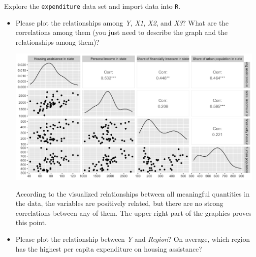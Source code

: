 \documentclass[12pt,letterpaper]{article}
\begin{document}
\vspace{.5cm}
\noindent Explore the \texttt{expenditure} data set and import data into \texttt{R}.
\vspace{.2cm}
  
\vspace{.2cm}
\begin{itemize}

\item
Please plot the relationships among \emph{Y}, \emph{X1}, \emph{X2}, and \emph{X3}? What are the correlations among them (you just need to describe the graph and the relationships among them)?
\vspace{.2cm}
  
\vspace{.2cm} 

\vspace{.2cm}
\includegraphics[width=\textwidth]{Babaian-plot1.png}
\vspace{.2cm}

According to the visualized relationships between all meaningful quantities in the data, the variables are positively related, but there are no strong correlations  between any of them. The upper-right part of the graphics proves this point.\\

\item
Please plot the relationship between \emph{Y} and \emph{Region}? On average, which region has the highest per capita expenditure on housing assistance?

\vspace{.2cm}
  
\vspace{.2cm} 


\end{itemize}
\end{document}
